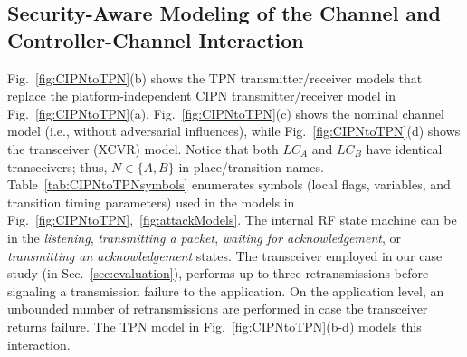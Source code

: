 \subsection{Security-Aware Modeling of the Channel and Controller-Channel Interaction}

Fig.~\ref{fig:CIPNtoTPN}(b) shows the TPN transmitter/receiver models that replace the platform-independent CIPN transmitter/receiver model in Fig.~\ref{fig:CIPNtoTPN}(a). Fig.~\ref{fig:CIPNtoTPN}(c) shows the nominal channel model (i.e., without adversarial influences), while Fig.~\ref{fig:CIPNtoTPN}(d) shows the transceiver (XCVR) model. Notice that both $LC_A$ and $LC_B$ have identical transceivers; thus, $N\in\{A,B\}$ in place/transition names. Table~\ref{tab:CIPNtoTPNsymbols} enumerates symbols (local flags, variables, and transition timing parameters) used in the models in Fig.~\ref{fig:CIPNtoTPN},~\ref{fig:attackModels}. The internal RF state machine can be in the \emph{listening}, \emph{transmitting a packet}, \emph{waiting for acknowledgement}, or \emph{transmitting an acknowledgement} states. The transceiver employed in our case study (in Sec.~\ref{sec:evaluation}), performs up to three retransmissions before signaling a transmission failure to the application. On the application level, an unbounded number of retransmissions are performed in case the transceiver returns failure. The TPN model in Fig.~\ref{fig:CIPNtoTPN}(b-d) models this interaction.


